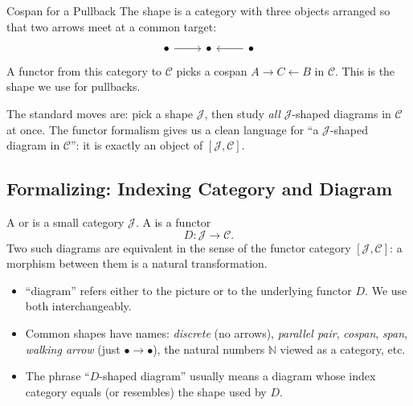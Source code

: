 \begin{example}{Cospan for a Pullback}
The shape is a category with three objects arranged so that two arrows
meet at a common target:
\[
\begin{tikzcd}
  \bullet \arrow[r] & \bullet & \bullet \arrow[l]
\end{tikzcd}
\]
A functor from this category to $\mathcal{C}$ picks a cospan
$A \to C \leftarrow B$ in $\mathcal{C}$. This is the shape we use for
pullbacks.
\end{example}

\begin{dialog}
The standard moves are: pick a shape $\mathcal{J}$, then study \emph{all}
$\mathcal{J}$-shaped diagrams in $\mathcal{C}$ at once. The functor
formalism gives us a clean language for ``a $\mathcal{J}$-shaped diagram
in $\mathcal{C}$'': it is exactly an object of $[\mathcal{J},
\mathcal{C}]$.
\end{dialog}

\subsection{Formalizing: Indexing Category and Diagram}

A  or  is a small category $\mathcal{J}$.
A  is a functor
\begin{equation*}
  D : \mathcal{J} \to \mathcal{C}.
\end{equation*}
Two such diagrams are equivalent in the sense of the functor category
$[\mathcal{J}, \mathcal{C}]$: a morphism between them is a natural
transformation.

\begin{howtosay}
\begin{itemize}
  \item ``diagram'' refers either to the picture or to the underlying
        functor $D$. We use both interchangeably.
  \item Common shapes have names: \emph{discrete} (no arrows),
        \emph{parallel pair}, \emph{cospan}, \emph{span}, \emph{walking
        arrow} (just $\bullet \to \bullet$), the natural numbers
        $\mathbb{N}$ viewed as a category, etc.
  \item The phrase ``$D$-shaped diagram'' usually means a diagram whose
        index category equals (or resembles) the shape used by $D$.
\end{itemize}
\end{howtosay}

